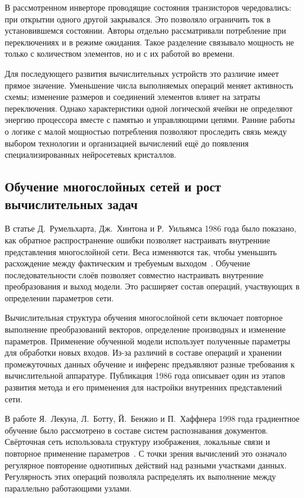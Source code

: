 В рассмотренном инверторе проводящие состояния транзисторов
чередовались: при открытии одного другой закрывался.
Это позволяло ограничить ток в установившемся состоянии.
Авторы отдельно рассматривали потребление при переключениях
и в режиме ожидания. Такое разделение связывало мощность
не только с количеством элементов, но и с их работой во времени.

Для последующего развития вычислительных устройств
это различие имеет прямое значение. Уменьшение числа
выполняемых операций меняет активность схемы; изменение
размеров и соединений элементов влияет на затраты переключения.
Однако характеристики одной логической ячейки не определяют
энергию процессора вместе с памятью и управляющими цепями.
Ранние работы о логике с малой мощностью потребления позволяют проследить
связь между выбором технологии и организацией вычислений
ещё до появления специализированных нейросетевых кристаллов.

\subsection{Обучение многослойных сетей и рост вычислительных задач}

В статье Д.~Румельхарта, Дж.~Хинтона и Р.~Уильямса 1986 года было показано,
как обратное распространение ошибки позволяет настраивать внутренние
представления многослойной сети. Веса изменяются так, чтобы уменьшить
расхождение между фактическим и требуемым выходом~\cite{rumelhart1986}.
Обучение последовательности слоёв позволяет совместно настраивать
внутренние преобразования и выход модели. Это расширяет состав
операций, участвующих в определении параметров сети.

Вычислительная структура обучения многослойной сети включает
повторное выполнение преобразований векторов, определение производных
и изменение параметров. Применение обученной модели использует
полученные параметры для обработки новых входов. Из-за различий в составе операций и хранении промежуточных данных обучение и
инференс предъявляют разные требования к вычислительной аппаратуре. Публикация
1986 года описывает один из этапов развития метода и его применения для
настройки внутренних представлений сети.

В работе Я.~Лекуна, Л.~Ботту, Й.~Бенжио и П.~Хаффнера 1998 года
градиентное обучение было рассмотрено в составе систем распознавания
документов. Свёрточная сеть использовала структуру изображения,
локальные связи и повторное применение параметров~\cite{lecun1998}.
С точки зрения вычислений это означало регулярное повторение однотипных
действий над разными участками данных. Регулярность этих операций
позволяла распределять их выполнение между параллельно работающими узлами.

